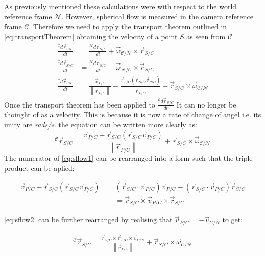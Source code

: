 \documentclass{UoNMCHA}
\newcommand{\norm}[1]{\left\lVert#1\right\rVert}
\numberwithin{equation}{section}
\begin{document}
As previously mentioned these calculations were with respect to the world reference frame $\mathcal{N}$. However, spherical flow is measured in the camera reference frame $\mathcal{C}$. Therefore we need to apply the transport theorem outlined in \cref{eq:transportTheorem} obtaining the velocity of a point $S$ as seen from $\mathcal{C}$
\begin{equation}
	\begin{split}
		\frac{{}^\mathcal{C}d\vec{r}_{S/C}}{dt} &= \frac{{}^\mathcal{N}d\vec{r}_{S/C}}{dt} + \vec{\omega}_{\mathcal{C}/\mathcal{N}}\times\vec{r}_{S/C}\\
		\frac{{}^\mathcal{C}d\vec{r}_{S/C}}{dt} &= \frac{{}^\mathcal{N}d\vec{r}_{S/C}}{dt} - \vec{\omega}_{\mathcal{N}/\mathcal{C}}\times\vec{r}_{S/C}\\
		\frac{{}^\mathcal{C}d\vec{r}_{S/C}}{dt} &=\frac{\vec{v}_{P/C}}{\norm{\vec{r}_{P/C}}} - \frac{\vec{r}_{S/C}(\vec{r}_{S/C}\vec{v}_{P/C})}{\norm{\vec{r}_{P/C}}} + \vec{r}_{S/C}\times\vec{\omega}_{\mathcal{C}/\mathcal{N}}
	\end{split}
\end{equation}
Once the transport theorem has been applied to $\frac{{}^\mathcal{C}d\vec{r}_{S/C}}{dt}$ It can no longer be thoiught of as a velocity. This is because it is now a rate of change of angel i.e. its unity are \textit{rads/s}. the equation can be written more clearly as:
\begin{equation}\label{eq:sflow1}
	{}^\mathcal{C}\dot{\vec{r}}_{S/C} =\frac{\vec{v}_{P/C}-\vec{r}_{S/C}(\vec{r}_{S/C}\vec{v}_{P/C})}{\norm{\vec{r}_{P/C}}} + \vec{r}_{S/C}\times\vec{\omega}_{\mathcal{C}/\mathcal{N}}
\end{equation}
The numerator of \cref{eq:sflow1} can be rearranged into a form such that the triple product can be aplied:

\begin{equation}\label{eq:sflow2}
	\begin{split}
		\vec{v}_{P/C}-\vec{r}_{S/C}(\vec{r}_{S/C}\vec{v}_{P/C}) =& (\vec{r}_{S/C}\cdot\vec{v}_{P/C})\vec{v}_{P/C}-(\vec{r}_{S/C}\cdot\vec{v}_{P/C})\vec{r}_{S/C}\\
		&=\vec{r}_{S/C}\times\vec{v}_{P/C}\times\vec{r}_{S/C}
	\end{split}
\end{equation}

\cref{eq:sflow2} can be further rearranged by realising that $\vec{v}_{P/C} = -\vec{v}_{C/N}$ to get:

\begin{equation}\label{eq:sflow3}
	\begin{split}
		{}^\mathcal{C}\dot{\vec{r}}_{S/C} =\frac{\vec{r}_{S/C}\times\vec{r}_{S/C}\times\vec{v}_{C/N}}{\norm{\vec{r}_{P/C}}} + \vec{r}_{S/C}\times\vec{\omega}_{\mathcal{C}/\mathcal{N}}
	\end{split}
\end{equation}
\end{document}
